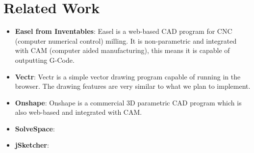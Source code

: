 
\section{Related Work}


\begin{itemize}
  \item \textbf{Easel from Inventables}: Easel is a web-based CAD program for CNC (computer numerical control) milling. It is non-parametric and integrated with CAM (computer aided manufacturing), this means it is capable of outputting G-Code.
  \item \textbf{Vectr}: Vectr is a simple vector drawing program capable of running in the browser. The drawing features are very similar to what we plan to implement.
  \item \textbf{Onshape}: Onshape is a commercial 3D parametric CAD program which is also web-based and integrated with CAM.
  \item \textbf{SolveSpace}:
  \item \textbf{jSketcher}: 
\end{itemize}
